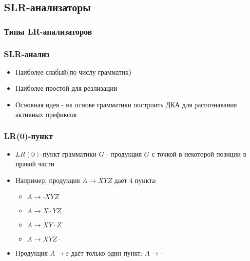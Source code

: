 \documentclass[16pt,pdf,unicode]{beamer}
\newcommand\drawnestedsets[4]{
  \def\position{#1}
  \def\nbsets{#2}
  \def\listofnestedsets{#3}
  \def\reversedlistofcolors{#4}

  \coordinate (circle-0) at (#1);
  \coordinate (set-0) at (#1);
  \foreach \set [count=\c] in \listofnestedsets {
    \pgfmathtruncatemacro{\cminusone}{\c - 1}
    \node[below=3pt of circle-\cminusone,inner sep=0]
    (set-\c) {$\set$};
    \node[circle,inner sep=0,fit=(circle-\cminusone)(set-\c)]
    (circle-\c) {};
  }

  \begin{scope}[on background layer]
    \foreach \col[count=\c] in \reversedlistofcolors {
      \pgfmathtruncatemacro{\invc}{\nbsets-\c}
      \pgfmathtruncatemacro{\invcplusone}{\invc+1}
      \node[circle,draw,fill=\col,inner sep=0,
      fit=(circle-\invc)(set-\invcplusone)] {};
    }
  \end{scope}
}
\begin{document}
\subsection{SLR-анализаторы}

\begin{frame}
\frametitle{Типы LR-анализаторов}
\vspace*{-0.5cm}
\begin{center}
\end{center}
\end{frame}

\begin{frame}
\frametitle{SLR-анализ}
\begin{itemize}
  \item Наиболее слабый(по числу грамматик)
  \item Наиболее простой для реализации
  \item Основная идея - на основе грамматики построить ДКА для распознавания активных префиксов
\end{itemize}
\end{frame}

\begin{frame}
\frametitle{LR(0)-пункт}
\begin{itemize}
  \item $LR(0)$-пункт грамматики $G$ - продукция $G$ с точкой в некоторой позиции в правой части
  \item Например, продукция $A \rightarrow XYZ$ даёт 4 пункта:
    \begin{itemize}
      \item $A \rightarrow \cdot XYZ$
      \item $A \rightarrow X \cdot YZ$
      \item $A \rightarrow XY \cdot Z$
      \item $A \rightarrow XYZ \cdot $
    \end{itemize}
  \item Продукция $A \rightarrow \varepsilon$ даёт только один пункт: $A \rightarrow \cdot$
\end{itemize}
\end{frame}
\end{document}

